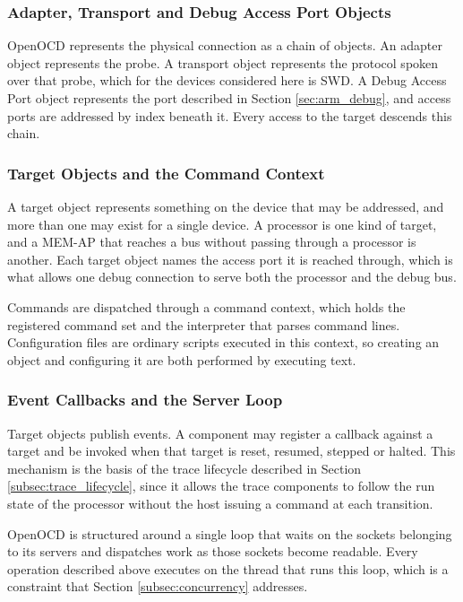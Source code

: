 \subsubsection{Adapter, Transport and Debug Access Port Objects}
OpenOCD represents the physical connection as a chain of objects. An adapter object represents the probe. A transport object represents the protocol spoken over that probe, which for the devices considered here is SWD. A Debug Access Port object represents the port described in Section \ref{sec:arm_debug}, and access ports are addressed by index beneath it. Every access to the target descends this chain.

\subsubsection{Target Objects and the Command Context}
A target object represents something on the device that may be addressed, and more than one may exist for a single device. A processor is one kind of target, and a MEM-AP that reaches a bus without passing through a processor is another. Each target object names the access port it is reached through, which is what allows one debug connection to serve both the processor and the debug bus.

Commands are dispatched through a command context, which holds the registered command set and the interpreter that parses command lines. Configuration files are ordinary scripts executed in this context, so creating an object and configuring it are both performed by executing text.

\subsubsection{Event Callbacks and the Server Loop}
Target objects publish events. A component may register a callback against a target and be invoked when that target is reset, resumed, stepped or halted. This mechanism is the basis of the trace lifecycle described in Section \ref{subsec:trace_lifecycle}, since it allows the trace components to follow the run state of the processor without the host issuing a command at each transition.

OpenOCD is structured around a single loop that waits on the sockets belonging to its servers and dispatches work as those sockets become readable. Every operation described above executes on the thread that runs this loop, which is a constraint that Section \ref{subsec:concurrency} addresses.

